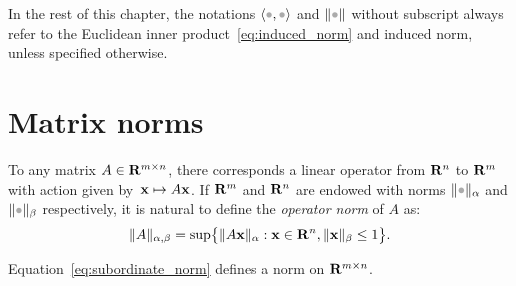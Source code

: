 In the rest of this chapter,
the notations $\ip{\placeholder,\placeholder}$ and $\norm{\placeholder}$ without subscript always refer to the Euclidean inner product~\eqref{eq:induced_norm} and induced norm,
unless specified otherwise.

\section{Matrix norms}%
\label{sec:matrix_norms}

To any matrix $A \in \mathbf R^{m \times n}$, there corresponds a linear operator from $\mathbf R^n$ to $\mathbf R^m$
with action given by~$\mathbf x \mapsto A \mathbf x$.
If $\mathbf R^m$ and $\mathbf R^n$ are endowed with norms $\norm{\placeholder}_{\alpha}$ and $\norm{\placeholder}_{\beta}$ respectively,
it is natural to define the \emph{operator norm} of $A$ as:
\begin{equation}
    \label{eq:subordinate_norm}
    \lVert A\rVert_{\alpha,\beta} = \sup \bigl\{ \lVert A \mathbf x\rVert_{\alpha} : \mathbf x \in \mathbf R^n, \lVert\mathbf x\rVert_{\beta} \leq 1 \bigr\}.
\end{equation}
\begin{proposition}
    Equation~\eqref{eq:subordinate_norm} defines a norm on $\mathbf R^{m \times n}$.
\end{proposition}

